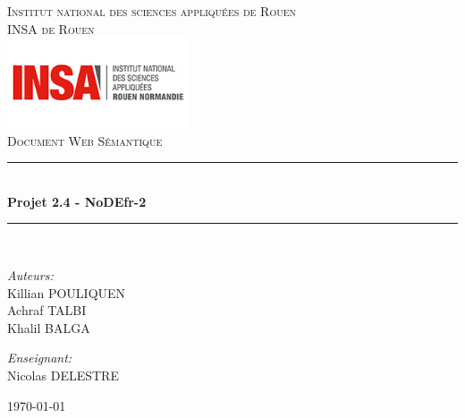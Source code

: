 \documentclass[11pt]{report}
\newcommand{\HRule}{\rule{\linewidth}{0.5mm}}
\begin{document}
\begin{titlepage}

  \begin{center}

    \textsc{{\LARGE Institut national des sciences appliquées de Rouen} \\ \vspace{6
        mm} {\Large INSA de Rouen}} \\
    \vspace{15mm}
    \includegraphics[width=0.4\textwidth]{./INSA.jpg}\\[1.0 cm]

    \textsc{\Large Document Web Sémantique}\\[0.5cm]


    \HRule \\[0.4cm]
           { \huge \bfseries Projet 2.4 - NoDEfr-2}\\[0.4cm]

           \HRule \\[1.5cm]

           \vspace{1.5cm}
           \begin{minipage}{0.4\textwidth}
             \begin{flushleft} \large
               \emph{Auteurs:}\\
               Killian \textsc{POULIQUEN}
               \\
               Achraf \textsc{TALBI}
               \\
               Khalil \textsc{BALGA}
             \end{flushleft}
           \end{minipage}
           \begin{minipage}{0.4\textwidth}
             \begin{flushright} \large
               \emph{Enseignant:} \\
               Nicolas \textsc{DELESTRE} 
             \end{flushright}
           \end{minipage}

           \vfill
               {\large \today}
  \end{center}

\end{titlepage} 
\tableofcontents
\end{document}
